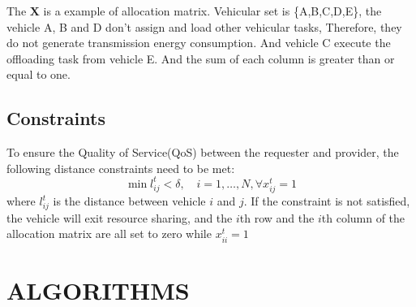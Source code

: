 \documentclass[conference]{IEEEtran}
\begin{document}
	The $\mathbf{X}$ is a example of allocation matrix. Vehicular set is \{A,B,C,D,E\}, the vehicle A, B and D don't assign and load other vehicular tasks, Therefore, they do not generate transmission energy consumption. And vehicle C execute the offloading task from vehicle E. And the sum of each column is greater than or equal to one.

\subsection{Constraints}
To ensure the Quality of Service(QoS) between the requester and provider, the following distance constraints need to be met:
\begin{equation}
	\min\limits_{ }
	l_{ij}^{t}<\delta
	,\quad
	i = 1,\dots,N,\forall x_{ij}^{t} =1
\end{equation}
where $l_ {ij}^{t}$ is the distance between vehicle $i$ and  $j$. If the constraint is not satisfied, the vehicle will exit resource sharing, and the $i$th row and the $i$th column of the allocation matrix are all set to zero while $x_{ii}^{t}=1$


\section{ALGORITHMS}
\end{document}
